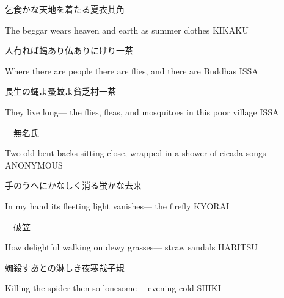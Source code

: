 \begin{haiku}
    {\FH 乞食かな天地を着たる夏衣}\hfill{\FH 其角}

    \vin{} The beggar
    \vin{} \vin{} wears heaven and earth
    \vin{} \vin{} \vin{} as summer clothes \hspace{\fill} KIKAKU
\end{haiku}

\begin{haiku}
    {\FH 人有れば蝿あり仏ありにけり}\hfill{\FH 一茶}

    \vin{} Where there are people
    \vin{} \vin{} there are flies, and
    \vin{} \vin{} \vin{} there are Buddhas \hspace{\fill} ISSA
\end{haiku}

\begin{haiku}
    {\FH 長生の蝿よ蚤蚊よ貧乏村}\hfill{\FH 一茶}

    \vin{} They live long---
    \vin{} \vin{} the flies, fleas, and mosquitoes
    \vin{} \vin{} \vin{} in this poor village \hspace{\fill} ISSA
\end{haiku}

\begin{haiku}
    {---}\hfill{\FH 無名氏}

    \vin{} Two old bent backs
    \vin{} \vin{} sitting close, wrapped in
    \vin{} \vin{} \vin{} a shower of cicada songs \hspace{\fill} ANONYMOUS
\end{haiku}

\begin{haiku}
    {\FH 手のうへにかなしく消る蛍かな}\hfill{\FH 去来}

    \vin{} In my hand
    \vin{} \vin{} its fleeting light vanishes---
    \vin{} \vin{} \vin{} the firefly \hspace{\fill} KYORAI
\end{haiku}

\begin{haiku}
    {---}\hfill{\FH 破笠}

    \vin{} How delightful
    \vin{} \vin{} walking on dewy grasses---
    \vin{} \vin{} \vin{} straw sandals \hspace{\fill} HARITSU
\end{haiku}

\begin{haiku}
    {\FH 蜘殺すあとの淋しき夜寒哉}\hfill{\FH 子規}

    \vin{} Killing the spider
    \vin{} \vin{} then so lonesome---
    \vin{} \vin{} \vin{} evening cold \hspace{\fill} SHIKI
\end{haiku}

